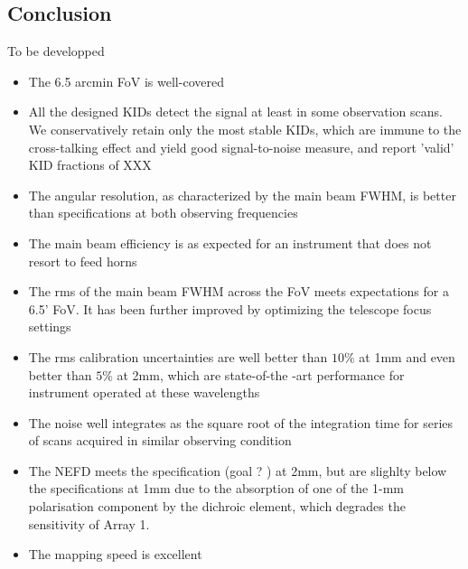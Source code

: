 \subsection*{Conclusion}

{\color{magenta} To be developped}

\begin{itemize}
\item{The 6.5 arcmin FoV is well-covered}
\item{All the designed KIDs detect the signal at least in some observation scans. We conservatively retain only the most stable KIDs, which are immune to the cross-talking effect and yield good signal-to-noise measure, and report 'valid' KID fractions of XXX}
\item{The angular resolution, as characterized by the main beam FWHM, is better than specifications at both observing frequencies}
\item{The main beam efficiency is as expected for an instrument that does not resort to feed horns}
\item{The rms of the main beam FWHM across the FoV meets expectations for a 6.5' FoV. It has been further improved by optimizing the telescope focus settings}
\item{The rms calibration uncertainties are well better than $10\%$ at 1mm and even better than $5\%$ at 2mm, which are state-of-the -art performance for instrument operated at these wavelengths}
\item{The noise well integrates as the square root of the integration time for series of scans acquired in similar observing condition}
\item{The NEFD meets the specification (goal ? ) at 2mm, but are slighlty below the specifications at 1mm due to the absorption of one of the 1-mm polarisation component by the dichroic element, which degrades the sensitivity of Array 1.}
\item{The mapping speed is excellent}
\end{itemize}
